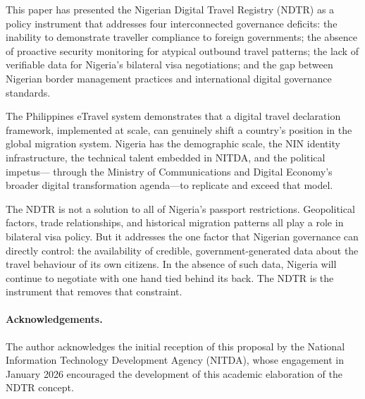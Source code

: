 \documentclass[11pt]{article}
\begin{document}
This paper has presented the Nigerian Digital Travel Registry (NDTR)
as a policy instrument that addresses four interconnected governance
deficits: the inability to demonstrate traveller compliance to
foreign governments; the absence of proactive security monitoring
for atypical outbound travel patterns; the lack of verifiable data
for Nigeria's bilateral visa negotiations; and the gap between
Nigerian border management practices and international digital
governance standards.

The Philippines eTravel system demonstrates that a digital travel
declaration framework, implemented at scale, can genuinely shift
a country's position in the global migration system.
Nigeria has the demographic scale, the NIN identity infrastructure,
the technical talent embedded in NITDA, and the political impetus---
through the Ministry of Communications and Digital Economy's
broader digital transformation agenda---to replicate and exceed
that model.

The NDTR is not a solution to all of Nigeria's passport restrictions.
Geopolitical factors, trade relationships, and historical migration
patterns all play a role in bilateral visa policy.
But it addresses the one factor that Nigerian governance can
directly control: the availability of credible, government-generated
data about the travel behaviour of its own citizens.
In the absence of such data, Nigeria will continue to negotiate
with one hand tied behind its back.
The NDTR is the instrument that removes that constraint.

\paragraph{Acknowledgements.}
The author acknowledges the initial reception of this proposal
by the National Information Technology Development Agency
(NITDA), whose engagement in January 2026 encouraged the
development of this academic elaboration of the NDTR concept.



\end{document}
